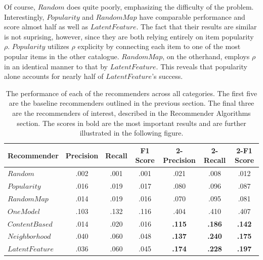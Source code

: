 \documentclass[11pt]{article}
\begin{document}
Of course, $Random$ does quite poorly, emphasizing the difficulty of the
problem. Interestingly, $Popularity$ and $RandomMap$ have comparable performance
and score almost half as well as $LatentFeature$. The fact that their results
are similar is not suprising, however, since they are both relying entirely on
item popularity $\rho$.  $Popularity$ utilizes $\rho$ explicity by connecting
each item to one of the most popular items in the other catalogue. $RandomMap$,
on the otherhand, employs $\rho$ in an identical manner to that by
$LatentFeature$. This reveals that popularity alone accounts for nearly half of
$LatentFeature$'s success.


\begin{table}
\begin{center}
\begin{tabular}{ | l || c | c | c || c | c | c |}
\hline
Recommender & Precision & Recall & F1 Score & 2-Precision & 2-Recall & 2-F1 Score \\ \hline\hline
$Random$ & .002 & .001 & .001 & .021 & .008 & .012 \\ \hline
$Popularity$ & .016 & .019 & .017 & .080 & .096 & .087 \\ \hline
$RandomMap$ & .014 & .019 & .016 & .070 & .095 & .081 \\ \hline
$OneModel$ & .103 & .132 & .116 & .404 & .410 & .407 \\ \hline
$ContentBased$ & .014 & .020 & .016 &
\textbf{.115} & \textbf{.186} & \textbf{.142} \\ \hline 
$Neighborhood$ & .040 & .060 & .048 &
\textbf{.137} & \textbf{.240} & \textbf{.175} \\ \hline 
$LatentFeature$ & .036 & .060 & .045 &
\textbf{.174} & \textbf{.228} & \textbf{.197} \\ \hline
\end{tabular}
\caption{The performance of each of the recommenders across all categories. The
first five are the baseline recommenders outlined in the previous section. The
final three are the recommenders of interest, described in the Recommender
Algorithms section. The scores in bold are the most important results and are 
further illustrated in the following figure.}
\end{center}
\end{table}
\end{document}
